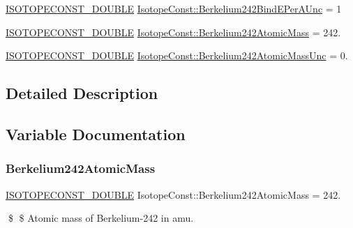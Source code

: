 \begin{DoxyCompactItemize}
\mbox{\hyperlink{group___isotope_const-_macros_ga8f45a7272ce02c0b4c65c44636ed719a}{I\+S\+O\+T\+O\+P\+E\+C\+O\+N\+S\+T\+\_\+\+D\+O\+U\+B\+LE}} \mbox{\hyperlink{group___isotope_const-_berkelium-_bk242_ga6dfaf6d6745a393ad47307f0c9558272}{Isotope\+Const\+::\+Berkelium242\+Bind\+E\+Per\+A\+Unc}} = 1
\item 
\mbox{\hyperlink{group___isotope_const-_macros_ga8f45a7272ce02c0b4c65c44636ed719a}{I\+S\+O\+T\+O\+P\+E\+C\+O\+N\+S\+T\+\_\+\+D\+O\+U\+B\+LE}} \mbox{\hyperlink{group___isotope_const-_berkelium-_bk242_ga252ae72dc7706cc50c96aba0907ff26a}{Isotope\+Const\+::\+Berkelium242\+Atomic\+Mass}} = 242.
\item 
\mbox{\hyperlink{group___isotope_const-_macros_ga8f45a7272ce02c0b4c65c44636ed719a}{I\+S\+O\+T\+O\+P\+E\+C\+O\+N\+S\+T\+\_\+\+D\+O\+U\+B\+LE}} \mbox{\hyperlink{group___isotope_const-_berkelium-_bk242_ga399e57b59637b7221f718df0ef96f1b9}{Isotope\+Const\+::\+Berkelium242\+Atomic\+Mass\+Unc}} = 0.
\end{DoxyCompactItemize}


\subsection{Detailed Description}


\subsection{Variable Documentation}
\mbox{\label{group___isotope_const-_berkelium-_bk242_ga252ae72dc7706cc50c96aba0907ff26a}} 
\subsubsection{\texorpdfstring{Berkelium242\+Atomic\+Mass}{Berkelium242AtomicMass}}
{\footnotesize\ttfamily \mbox{\hyperlink{group___isotope_const-_macros_ga8f45a7272ce02c0b4c65c44636ed719a}{I\+S\+O\+T\+O\+P\+E\+C\+O\+N\+S\+T\+\_\+\+D\+O\+U\+B\+LE}} Isotope\+Const\+::\+Berkelium242\+Atomic\+Mass = 242.}

\$ \$ Atomic mass of Berkelium-\/242 in amu. \mbox{\label{group___isotope_const-_berkelium-_bk242_ga399e57b59637b7221f718df0ef96f1b9}} 
